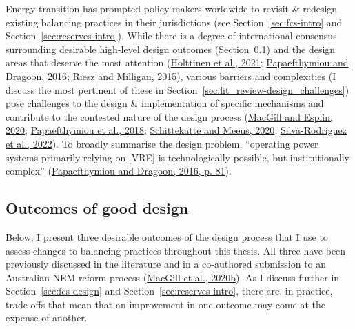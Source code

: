 \documentclass[12pt,a4paper,]{report}
\begin{document}
Energy transition has prompted policy-makers worldwide to revisit \&
redesign existing balancing practices in their jurisdictions (see
Section~\ref{sec:fcs-intro} and Section~\ref{sec:reserves-intro}). While
there is a degree of international consensus surrounding desirable
high-level design outcomes
(Section~\ref{sec:lit_review-design_outcomes}) and the design areas that
deserve the most attention
(\protect\hyperlink{ref-holttinenDesignOperationEnergy2021}{Holttinen et
al., 2021};
\protect\hyperlink{ref-papaefthymiou100RenewableEnergy2016}{Papaefthymiou
and Dragoon, 2016};
\protect\hyperlink{ref-rieszDesigningElectricityMarkets2015}{Riesz and
Milligan, 2015}), various barriers and complexities (I discuss the most
pertinent of these in Section~\ref{sec:lit_review-design_challenges})
pose challenges to the design \& implementation of specific mechanisms
and contribute to the contested nature of the design process
(\protect\hyperlink{ref-macgillEndtoendElectricityMarket2020}{MacGill
and Esplin, 2020};
\protect\hyperlink{ref-papaefthymiouPowerSystemFlexibility2018}{Papaefthymiou
et al., 2018};
\protect\hyperlink{ref-schittekatteFlexibilityMarketsProject2020}{Schittekatte
and Meeus, 2020};
\protect\hyperlink{ref-silva-rodriguezShortTermWholesale2022}{Silva-Rodriguez
et al., 2022}). To broadly summarise the design problem, ``operating
power systems primarily relying on {[}VRE{]} is technologically
possible, but institutionally complex''
(\protect\hyperlink{ref-papaefthymiou100RenewableEnergy2016}{Papaefthymiou
and Dragoon, 2016, p. 81}).

\hypertarget{sec:lit_review-design_outcomes}{%
\subsection{Outcomes of good
design}\label{sec:lit_review-design_outcomes}}

Below, I present three desirable outcomes of the design process that I
use to assess changes to balancing practices throughout this thesis. All
three have been previously discussed in the literature and in a
co-authored submission to an Australian NEM reform process
(\protect\hyperlink{ref-macgillResponseEnergySecurity2020}{MacGill et
al., 2020b}). As I discuss further in Section~\ref{sec:fcs-design} and
Section~\ref{sec:reserves-intro}, there are, in practice, trade-offs
that mean that an improvement in one outcome may come at the expense of
another.
\end{document}
